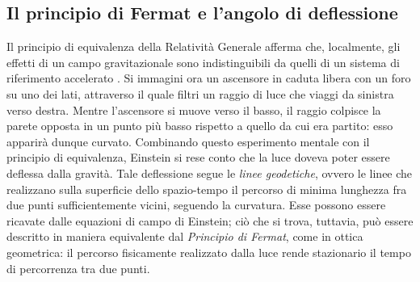 \subsection{Il principio di Fermat e l'angolo di deflessione}
\label{sez:Fermat-defl}
Il principio di equivalenza della Relatività Generale afferma che, localmente, gli effetti di un campo gravitazionale sono indistinguibili da quelli di un sistema di riferimento accelerato \parencite{Schneider1992}. Si immagini ora un ascensore in caduta libera con un foro su uno dei lati, attraverso il quale filtri un raggio di luce che viaggi da sinistra verso destra. Mentre l'ascensore si muove verso il basso, il raggio colpisce la parete opposta in un punto più basso rispetto a quello da cui era partito: esso apparirà dunque curvato. Combinando questo esperimento mentale con il principio di equivalenza, Einstein si rese conto che la luce doveva poter essere deflessa dalla gravità. Tale deflessione segue le \emph{linee geodetiche}, ovvero le linee che realizzano sulla superficie dello spazio-tempo il percorso di minima lunghezza fra due punti sufficientemente vicini, seguendo la curvatura. Esse possono essere ricavate dalle equazioni di campo di Einstein; ciò che si trova, tuttavia, può essere descritto in maniera equivalente dal \emph{Principio di Fermat}, come in ottica geometrica: il percorso fisicamente realizzato dalla luce rende stazionario il tempo di percorrenza tra due punti.

